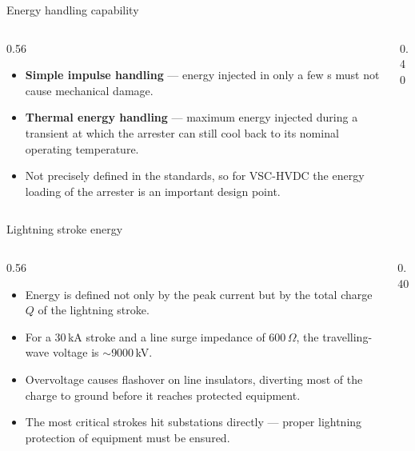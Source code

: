 \begin{frame}{Energy handling capability}
  \begin{columns}[c,onlytextwidth]
    \begin{column}{0.56\textwidth}
      \begin{itemize}
        \setlength{\itemsep}{0.4em}
        \item \textbf{Simple impulse handling} --- energy injected in only a
              few \textmu s must not cause mechanical damage.
        \item \textbf{Thermal energy handling} --- maximum energy injected
              during a transient at which the arrester can still cool back to
              its nominal operating temperature.
        \item Not precisely defined in the standards, so for VSC-HVDC the
              energy loading of the arrester is an important design point.
      \end{itemize}
    \end{column}
    \begin{column}{0.40\textwidth}
      \centering
    \end{column}
  \end{columns}
\end{frame}

\begin{frame}{Lightning stroke energy}
  \begin{columns}[c,onlytextwidth]
    \begin{column}{0.56\textwidth}
      \begin{itemize}
        \setlength{\itemsep}{0.35em}
        \item Energy is defined not only by the peak current but by the total
              charge $Q$ of the lightning stroke.
        \item For a 30\,kA stroke and a line surge impedance of 600\,$\Omega$,
              the travelling-wave voltage is $\sim$9000\,kV.
        \item Overvoltage causes flashover on line insulators, diverting most
              of the charge to ground before it reaches protected equipment.
        \item The most critical strokes hit substations directly --- proper
              lightning protection of equipment must be ensured.
      \end{itemize}
    \end{column}
    \begin{column}{0.40\textwidth}
      \centering
    \end{column}
  \end{columns}
\end{frame}

